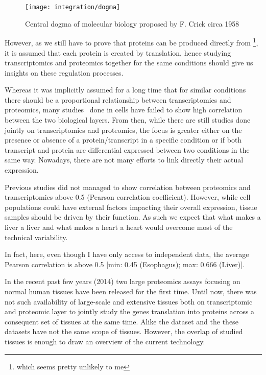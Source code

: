 \begin{figure}
    \texttt{[image: integration/dogma]}\centering
    \caption{\label{dogma} Central dogma of molecular biology proposed by F. Crick circa 1958}
\end{figure}

However, as we still have to prove that proteins can be produced directly
from \DNA \footnote{which seems pretty unlikely to me}, it is assumed that
each protein is created by translation, hence studying
transcriptomics and proteomics together for the same conditions should give us
insights on these regulation processes.

Whereas it was implicitly assumed for a long time that for similar conditions
there should be a proportional relationship between transcriptomics and proteomics,
many studies\
done in cells have failed to show high correlation between the two biological layers.
From then, while there are still studies done jointly on transcriptomics and
proteomics, the focus is greater either on the presence or absence of a
protein/transcript in a specific condition or if both transcript and protein
are differential expressed between two conditions in the same way.
Nowadays, there are not many efforts to link directly their actual expression.

Previous studies did not managed to show correlation between proteomics and
transcriptomics above 0.5 (Pearson correlation coefficient).
However, while cell populations could have external factors impacting their overall
expression, tissue samples should be driven by their function.
As such we expect that what makes a liver a liver and what makes a heart a heart
would overcome most of the technical variability.

In fact, here, even though I have only access to independent data,
the average Pearson correlation is above 0.5 [min: 0.45 (Esophagus); max: 0.666 (Liver)].


In the recent past few years (2014) two large proteomics assays focusing on normal
human tissues have been released for the first time.
Until now, there was not such availability of large-scale and extensive tissues
both on transcriptomic and proteomic layer to jointly study the genes
translation into proteins across a consequent set of tissues
at the same time. Alike the  dataset and the 
these datasets have not the same scope of tissues. However, the overlap of
studied tissues is enough to draw an overview of the current technology.



